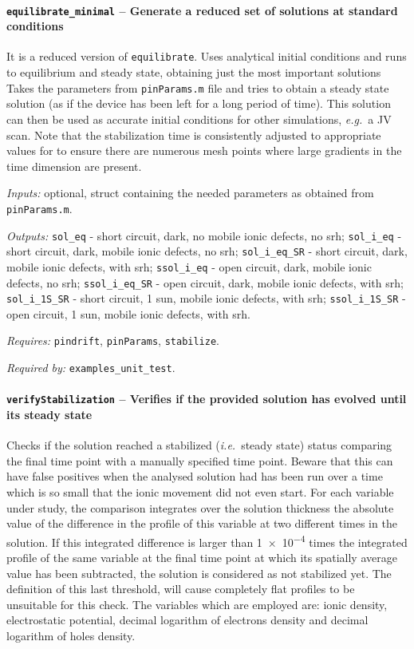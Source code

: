 \paragraph{\texttt{equilibrate\_minimal} -- Generate a reduced set of solutions at standard conditions}
It is a reduced version of \texttt{equilibrate}. 
Uses analytical initial conditions and runs to equilibrium and steady state, obtaining just the most important solutions
 Takes the parameters from \texttt{pin\-Params.m} file and tries
 to obtain a steady state solution (as if the device has been left for
 a long period of time). This solution can then be used as accurate
 initial conditions for other simulations, \textsl{e.g.}\ a JV scan.
 Note that the stabilization time is consistently adjusted to appropriate values for to
 ensure there are numerous mesh points where large gradients in the time
 dimension are present.
 
\textit{Inputs:} optional, struct containing the needed parameters as obtained
     from \texttt{pin\-Params.m}.
     
\textit{Outputs:} \texttt{sol\_eq} - short circuit, dark, no mobile ionic defects, no \gls{srh};
   \texttt{sol\_i\_eq} - short circuit, dark, mobile ionic defects, no \gls{srh};
   \texttt{sol\_i\_eq\_SR} - short circuit, dark, mobile ionic defects, with \gls{srh};
   \texttt{ssol\_i\_eq} - open circuit, dark, mobile ionic defects, no \gls{srh};
   \texttt{ssol\_i\_eq\_SR} - open circuit, dark, mobile ionic defects, with \gls{srh};
   \texttt{sol\_i\_1S\_SR} - short circuit, 1 sun, mobile ionic defects, with \gls{srh};
   \texttt{ssol\_i\_1S\_SR} - open circuit, 1 sun, mobile ionic defects, with \gls{srh}.

\textit{Requires:} \texttt{pin\-drift}, \texttt{pinParams}, \texttt{stabilize}.

\textit{Required by:} \texttt{examples\_unit\_test}.

		\paragraph{\texttt{verify\-Stabilization} -- Verifies if the provided solution has evolved until its steady state}\label{verifyStabilization}
Checks if the solution reached a stabilized (\textsl{i.e.}\ steady state) status comparing the final time point with a manually specified time point. Beware that this can have false positives when the analysed solution had
 has been run over a time which is so small that the ionic movement did not even start.
 For each variable under study, the comparison integrates over the solution thickness the absolute value of the difference in the profile of this variable at two different times in the solution.
 If this integrated difference is larger than \num{1e-4} times the integrated profile of the same variable at the final time point at which its spatially average value has been subtracted, the solution is considered as not stabilized yet.
 The definition of this last threshold, will cause completely flat profiles to be unsuitable for this check.
 The variables which are employed are: ionic density, electrostatic potential, decimal logarithm of electrons density and decimal logarithm of holes density.
 
